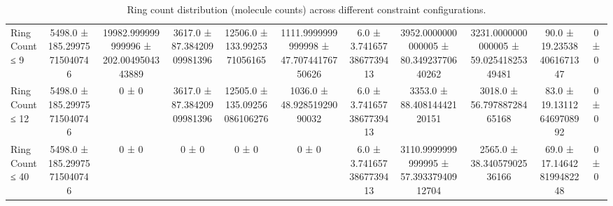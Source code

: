 \begin{table}[H]
\begin{tabular}{l c c c c c c c c c c}
        Ring Count ≤ 9 & 5498.0 ± 185.29975715040746 & 19982.999999999996 ± 202.0049504343889 & 3617.0 ± 87.38420909981396 & 12506.0 ± 133.9925371056165 & 1111.9999999999998 ± 47.70744176750626 & 6.0 ± 3.7416573867739413 & 3952.0000000000005 ± 80.34923770640262 & 3231.0000000000005 ± 59.02541825349481 & 90.0 ± 19.235384061671347 & 0 ± 0 \\
        Ring Count ≤ 12 & 5498.0 ± 185.29975715040746 & 0 ± 0 & 3617.0 ± 87.38420909981396 & 12505.0 ± 135.09256086106276 & 1036.0 ± 48.92851929090032 & 6.0 ± 3.7416573867739413 & 3353.0 ± 88.40814442120151 & 3018.0 ± 56.79788728465168 & 83.0 ± 19.131126469708992 & 0 ± 0 \\
        Ring Count ≤ 40 & 5498.0 ± 185.29975715040746 & 0 ± 0 & 0 ± 0 & 0 ± 0 & 0 ± 0 & 6.0 ± 3.7416573867739413 & 3110.9999999999995 ± 57.39337940912704 & 2565.0 ± 38.34057902536166 & 69.0 ± 17.146428199482248 & 0 ± 0 \\
        \bottomrule
    \end{tabular}
    \caption{Ring count distribution (molecule counts) across different constraint configurations.}
\end{table}

